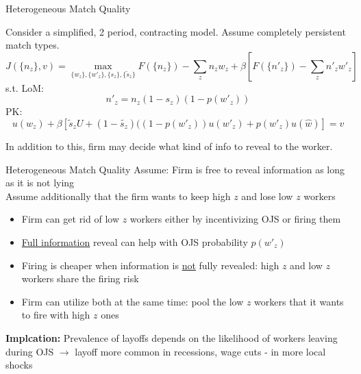 \documentclass[9pt,aspectratio=169]{beamer} %
\begin{document}
\begin{frame}[noframenumbering]{Heterogeneous Match Quality}
\hypertarget{HMQ Assumption}{}

Consider a simplified, 2 period, contracting model. Assume completely persistent match types. \\
\[J(\{n_z\},v) = \max_{\{w_z\},\{w'_z\},\{s_z\},\{\tilde{s}_z\}} F(\{n_z\}) - \sum_{z} n_z w_z + \beta [F(\{n'_z\})-\sum_z n'_z w'_z]\]
s.t. LoM: \[n'_z = n_z (1-s_z)(1-p(w'_z))\] 
PK: \[u(w_z)+\beta[\tilde{s}_zU+(1-\tilde{s_z})((1-p(w'_z))u(w'_z)+p(w'_z)u(\hat{w})]=v\] 

In addition to this, firm may decide what kind of info to reveal to the worker.
\vspace{10pt}
\end{frame}

\begin{frame}[noframenumbering]{Heterogeneous Match Quality}
Assume: Firm is free to reveal information as long as it is not lying
\\
Assume additionally that the firm wants to keep high $z$ and lose low $z$ workers
\vspace{0.5cm}
\begin{itemize}
    \item Firm can get rid of low $z$ workers either by incentivizing OJS or firing them
    \vspace{5pt}
    \item \underline{Full information} reveal can help with OJS probability $p(w'_z)$
    \vspace{5pt}
    \item Firing is cheaper when information is \underline{not} fully revealed: high $z$ and low $z$ workers share the firing risk
    \vspace{5pt}
    \item Firm can utilize both at the same time: pool the low $z$ workers that it wants to fire with high $z$ ones
\end{itemize}
\vspace{0.5cm}
\textbf{Implcation:} Prevalence of layoffs depends on the likelihood of workers leaving during OJS $\rightarrow$ layoff more common in recessions, wage cuts - in more local shocks
\hyperlink{HMQ}{} %
\end{frame}
\end{document}
